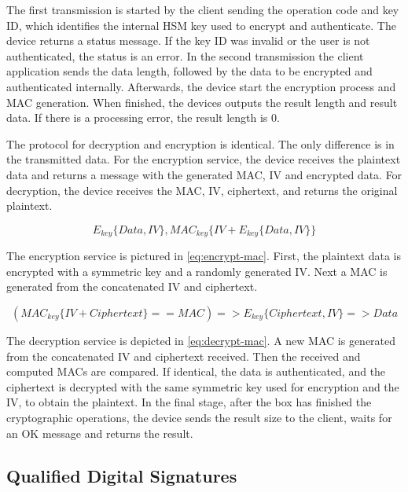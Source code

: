 The first transmission is started by the client sending the operation code and key ID, which identifies the internal \ac{HSM} key used to encrypt and authenticate.
The device returns a status message. If the key ID was invalid or the user is not authenticated, the status is an error.
In the second transmission the client application sends the data length, followed by the data to be encrypted and authenticated internally.
Afterwards, the device start the encryption process and \ac{MAC} generation. When finished, the devices outputs the result length and result data. If there is a processing error, the result length is 0.

The protocol for decryption and encryption is identical. The only difference is in the transmitted data. For the encryption service, the device receives the plaintext data and returns a message with the generated \ac{MAC}, \ac{IV} and encrypted data. For decryption, the device receives the \ac{MAC}, \ac{IV}, ciphertext, and returns the original plaintext.

\begin{equation}
	\label{eq:encrypt-mac}
	E_{key}\{Data, IV\}, MAC_{key}\{IV+E_{key}\{Data, IV\}\}
\end{equation}

The encryption service is pictured in \ref{eq:encrypt-mac}.
First, the plaintext data is encrypted with a symmetric key and a randomly generated \ac{IV}. Next a \ac{MAC} is generated from the concatenated \ac{IV} and ciphertext.

\begin{equation}
	\label{eq:decrypt-mac}
	(MAC_{key}\{IV+Ciphertext\} == MAC) => E_{key}\{Ciphertext, IV\} => Data
\end{equation}

The decryption service is depicted in \ref{eq:decrypt-mac}.
A new \ac{MAC} is generated from the concatenated \ac{IV} and ciphertext received. Then the received and computed {MAC}s are compared. If identical, the data is authenticated, and the ciphertext is decrypted with the same symmetric key used for encryption and the \ac{IV}, to obtain the plaintext.
In the final stage, after the box has finished the cryptographic operations, the device sends the result size to the client, waits for an OK message and returns the result.

\subsection{Qualified Digital Signatures}\label{chap:arch:services:signatures}

